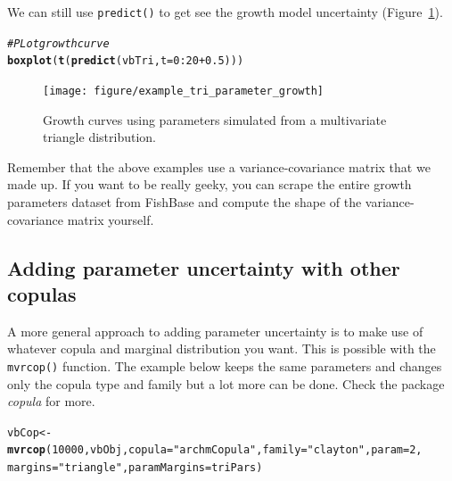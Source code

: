 \documentclass[a4paper,english,10pt]{article}\usepackage[]{graphicx}\usepackage[]{color}
\makeatletter
\newcommand{\hlnum}[1]{\textcolor[rgb]{0.686,0.059,0.569}{#1}}%
\newcommand{\hlstr}[1]{\textcolor[rgb]{0.192,0.494,0.8}{#1}}%
\newcommand{\hlcom}[1]{\textcolor[rgb]{0.678,0.584,0.686}{\textit{#1}}}%
\newcommand{\hlopt}[1]{\textcolor[rgb]{0,0,0}{#1}}%
\newcommand{\hlstd}[1]{\textcolor[rgb]{0.345,0.345,0.345}{#1}}%
\newcommand{\hlkwb}[1]{\textcolor[rgb]{0.69,0.353,0.396}{#1}}%
\newcommand{\hlkwc}[1]{\textcolor[rgb]{0.333,0.667,0.333}{#1}}%
\newcommand{\hlkwd}[1]{\textcolor[rgb]{0.737,0.353,0.396}{\textbf{#1}}}%
\newenvironment{kframe}{%
 \def\at@end@of@kframe{}%
 \ifinner\ifhmode%
  \def\at@end@of@kframe{\end{minipage}}%
  \begin{minipage}{\columnwidth}%
 \fi\fi%
 \def\FrameCommand##1{\hskip\@totalleftmargin \hskip-\fboxsep
 \colorbox{shadecolor}{##1}\hskip-\fboxsep
     \hskip-\linewidth \hskip-\@totalleftmargin \hskip\columnwidth}%
 \MakeFramed {\advance\hsize-\width
   \@totalleftmargin\z@ \linewidth\hsize
   \@setminipage}}%
 {\par\unskip\endMakeFramed%
 \at@end@of@kframe}
\newenvironment{knitrout}{}{} %
\newcommand{\code}[1]{{\texttt{#1}}}
\makeatother
\begin{document}
We can still use \code{predict()} to get see the growth model uncertainty (Figure~\ref{fig:plot_tri_growth}).

\begin{knitrout}
\color{fgcolor}\begin{kframe}
\begin{alltt}
\hlcom{# PLot growth curve}
\hlkwd{boxplot}\hlstd{(}\hlkwd{t}\hlstd{(}\hlkwd{predict}\hlstd{(vbTri,} \hlkwc{t} \hlstd{=} \hlnum{0}\hlopt{:}\hlnum{20} \hlopt{+} \hlnum{0.5}\hlstd{)))}
\end{alltt}
\end{kframe}
\end{knitrout}


\begin{figure}[h]
\begin{knitrout}
\color{fgcolor}

{\centering \texttt{[image: figure/example\_tri\_parameter\_growth]} 

}



\end{knitrout}

\caption{Growth curves using parameters simulated from a multivariate triangle distribution.}
\label{fig:plot_tri_growth}
\end{figure}

Remember that the above examples use a variance-covariance matrix that we made up.
If you want to be really geeky, you can scrape the entire growth parameters dataset from FishBase and compute the shape of the variance-covariance matrix yourself.

\subsection{Adding parameter uncertainty with other copulas}

A more general approach to adding parameter uncertainty is to make use of whatever copula and marginal distribution you want.
This is possible with the \code{mvrcop()} function. The example below keeps the same parameters and changes only the copula type and family but a lot more can be done. Check the package \emph{copula} for more. 


\begin{knitrout}
\color{fgcolor}\begin{kframe}
\begin{alltt}
\hlstd{vbCop} \hlkwb{<-} \hlkwd{mvrcop}\hlstd{(}\hlnum{10000}\hlstd{, vbObj,} \hlkwc{copula} \hlstd{=} \hlstr{"archmCopula"}\hlstd{,} \hlkwc{family} \hlstd{=} \hlstr{"clayton"}\hlstd{,} \hlkwc{param} \hlstd{=} \hlnum{2}\hlstd{,}
    \hlkwc{margins} \hlstd{=} \hlstr{"triangle"}\hlstd{,} \hlkwc{paramMargins} \hlstd{= triPars)}
\end{alltt}
\end{kframe}
\end{knitrout}
\end{document}
